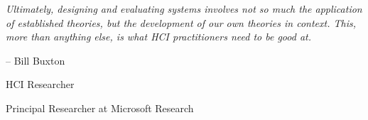 
\null

\vfill

\begin{displayquote}
\onehalfspacing\Large\itshape
Ultimately, designing and evaluating systems involves not so much the application of established theories, but the development of our own theories in context. This, more than anything else, is what HCI practitioners need to be good at.

-- Bill Buxton

\ac{HCI} Researcher

Principal Researcher at Microsoft Research
\end{displayquote}

\vfill

\vfill
%
